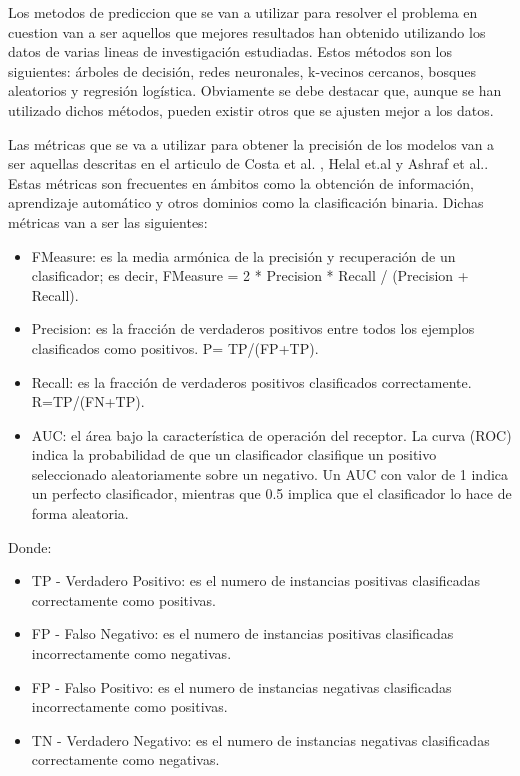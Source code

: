 Los metodos de prediccion que se van a utilizar para resolver el problema en cuestion van a ser aquellos que mejores resultados han obtenido utilizando los datos de varias lineas de investigación estudiadas. Estos métodos son los siguientes: árboles de decisión, redes neuronales, k-vecinos cercanos, bosques aleatorios y regresión logística. Obviamente se debe destacar que, aunque se han utilizado dichos métodos, pueden existir otros que se ajusten mejor a los datos.

Las métricas que se va a utilizar para obtener la precisión de los modelos van a ser aquellas descritas en el articulo de Costa et al. \cite{Costa2017}, Helal et.al \cite{Helal2018} y Ashraf et al.\cite{Ashraf2018}. Estas métricas son frecuentes en ámbitos como la obtención de información, aprendizaje automático y otros dominios como la clasificación binaria. Dichas métricas van a ser las siguientes:

\begin{itemize}
	\item FMeasure: es la media armónica de la precisión y recuperación de un clasificador; es decir, FMeasure = 2 * Precision * Recall / (Precision + Recall).
	\item Precision: es la fracción de verdaderos positivos entre todos los ejemplos clasificados como positivos. P= TP/(FP+TP).
	\item Recall: es la fracción de verdaderos positivos clasificados correctamente. R=TP/(FN+TP).
	\item AUC: el área bajo la característica de operación del receptor. La curva (ROC) indica la probabilidad de que un clasificador clasifique un positivo seleccionado aleatoriamente sobre un negativo. Un AUC con valor de 1 indica un perfecto clasificador, mientras que 0.5 implica que el clasificador lo hace de forma aleatoria.
\end{itemize}

Donde:
\begin{itemize}
	\item TP - Verdadero Positivo: es el numero de instancias positivas clasificadas correctamente como positivas. 
	\item FP - Falso Negativo: es el numero de instancias positivas clasificadas incorrectamente como negativas.
	\item FP - Falso Positivo: es el numero de instancias negativas clasificadas incorrectamente como positivas.
	\item TN - Verdadero Negativo: es el numero de instancias negativas clasificadas correctamente como negativas.
\end{itemize}